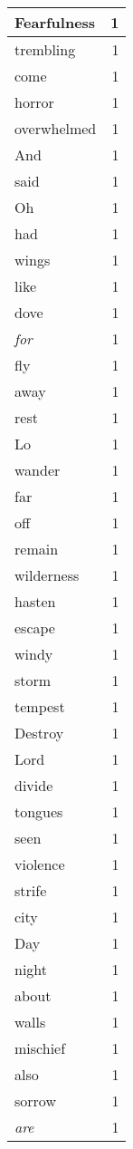 \begin{center}
\begin{longtable}{l|r}
Fearfulness & 1 \\ \hline
trembling & 1 \\ \hline
come & 1 \\ \hline
horror & 1 \\ \hline
overwhelmed & 1 \\ \hline
And & 1 \\ \hline
said & 1 \\ \hline
Oh & 1 \\ \hline
had & 1 \\ \hline
wings & 1 \\ \hline
like & 1 \\ \hline
dove & 1 \\ \hline
\emph{for} & 1 \\ \hline
fly & 1 \\ \hline
away & 1 \\ \hline
rest & 1 \\ \hline
Lo & 1 \\ \hline
wander & 1 \\ \hline
far & 1 \\ \hline
off & 1 \\ \hline
remain & 1 \\ \hline
wilderness & 1 \\ \hline
hasten & 1 \\ \hline
escape & 1 \\ \hline
windy & 1 \\ \hline
storm & 1 \\ \hline
tempest & 1 \\ \hline
Destroy & 1 \\ \hline
Lord & 1 \\ \hline
divide & 1 \\ \hline
tongues & 1 \\ \hline
seen & 1 \\ \hline
violence & 1 \\ \hline
strife & 1 \\ \hline
city & 1 \\ \hline
Day & 1 \\ \hline
night & 1 \\ \hline
about & 1 \\ \hline
walls & 1 \\ \hline
mischief & 1 \\ \hline
also & 1 \\ \hline
sorrow & 1 \\ \hline
\emph{are} & 1 \\ \hline

\end{longtable}
\end{center}

